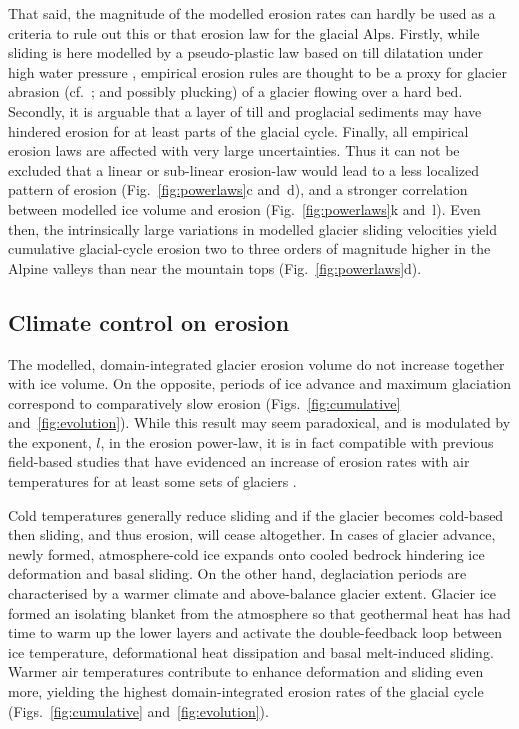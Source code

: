 \documentclass[esurf, manuscript]{copernicus}
\begin{document}
    That said, the magnitude of the modelled erosion rates can hardly be used
    as a criteria to rule out this or that erosion law for the glacial Alps.
    Firstly, while sliding is here modelled by a pseudo-plastic law based on
    till dilatation under high water pressure \citep{Tulaczyk.etal.2000},
    empirical erosion rules are thought to be a proxy for glacier abrasion
    (cf.~\citealp{Hallet.1979}; and possibly plucking) of a glacier flowing
    over a hard bed. Secondly, it is
    arguable that a layer of till and proglacial sediments may have hindered
    erosion for at least parts of the glacial cycle. Finally, all empirical
    erosion laws are affected with very large uncertainties. Thus it can not
    be excluded that a linear or sub-linear erosion-law
    \citep[e.g.,][]{Cook.etal.2020} would lead to a less localized pattern of
    erosion (Fig.~\ref{fig:powerlaws}c and~d), and a stronger correlation
    between modelled ice volume and erosion (Fig.~\ref{fig:powerlaws}k and~l).
    Even then, the intrinsically large variations in modelled glacier sliding
    velocities yield cumulative glacial-cycle erosion two to three orders of
    magnitude higher in the Alpine valleys than near the mountain tops
    (Fig.~\ref{fig:powerlaws}d).


\subsection{Climate control on erosion}

    The modelled, domain-integrated glacier erosion volume do not increase
    together with ice volume. On the opposite, periods of ice advance and
    maximum glaciation correspond to comparatively slow erosion
    (Figs.~\ref{fig:cumulative} and~\ref{fig:evolution}). While this result may
    seem paradoxical, and is modulated by the exponent, $l$, in the erosion
    power-law, it is in fact compatible with previous field-based studies that
    have evidenced an increase of erosion rates with air temperatures for at
    least some sets of glaciers \citep{Koppes.etal.2015, Cook.etal.2020}.

    Cold temperatures generally reduce sliding \citep{Koppes.etal.2015} and if
    the glacier becomes cold-based then sliding, and thus erosion, will cease
    altogether. In cases of glacier advance, newly formed, atmosphere-cold ice
    expands onto cooled bedrock hindering ice deformation and basal sliding.
    On the other hand, deglaciation periods are characterised by a warmer
    climate and above-balance glacier extent. Glacier ice formed an isolating
    blanket from the atmosphere so that geothermal heat has had time to warm up
    the lower layers and activate the double-feedback loop between ice
    temperature, deformational heat dissipation and basal melt-induced sliding.
    Warmer air temperatures contribute to enhance deformation and sliding even
    more, yielding the highest domain-integrated erosion rates of the
    glacial cycle (Figs.~\ref{fig:cumulative} and~\ref{fig:evolution}).
\end{document}
